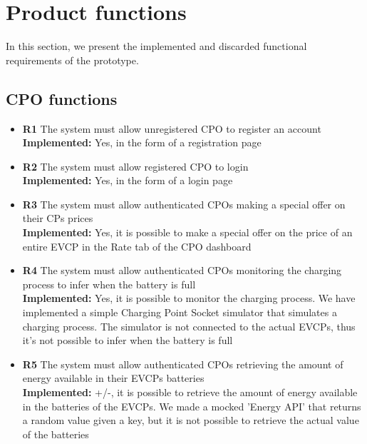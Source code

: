 \section{Product functions}
In this section, we present the implemented and discarded functional requirements of the prototype.

\subsection{CPO functions}

\begin{itemize}
      \item        \textbf{R1}  The system must allow unregistered CPO to register an account                                                                                            \\
            \textbf{Implemented:} Yes, in the form of a registration page
      \item        \textbf{R2}  The system must allow registered CPO to login                                                                                                            \\
            \textbf{Implemented:} Yes, in the form of a login page
      \item        \textbf{R3}  The system must allow authenticated CPOs making a special offer on their CPs prices                                                                      \\
            \textbf{Implemented:} Yes, it is possible to make a special offer on the price of an entire EVCP in the Rate tab of the CPO dashboard
      \item        \textbf{R4}  The system must allow authenticated CPOs monitoring the charging process to infer when the battery is full                                               \\
            \textbf{Implemented:} Yes, it is possible to monitor the charging process. We have implemented a simple Charging Point Socket simulator that simulates a charging process. The simulator is not connected to the actual EVCPs, thus it's not possible to infer when the battery is full
      \item        \textbf{R5}  The system must allow authenticated CPOs retrieving the amount of energy available in their EVCPs batteries                                              \\
            \textbf{Implemented:} +/-, it is possible to retrieve the amount of energy available in the batteries of the EVCPs. We made a mocked 'Energy API' that returns a random value given a key, but it is not possible to retrieve the actual value of the batteries

\end{itemize}
